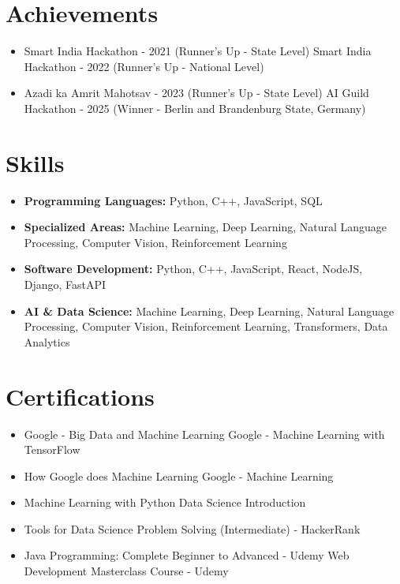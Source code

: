 \documentclass[a4paper,10pt]{article}
\begin{document}
\section*{Achievements}
\begin{itemize}
\item Smart India Hackathon - 2021 (Runner's Up - State Level) \hfill Smart India Hackathon - 2022 (Runner's Up - National Level)
\item Azadi ka Amrit Mahotsav - 2023 (Runner's Up - State Level) \hfill AI Guild Hackathon - 2025 (Winner - Berlin and Brandenburg State, Germany)
\end{itemize}

\section*{Skills}
\begin{itemize}
  \item \textbf{Programming Languages:} Python, C++, JavaScript, SQL
  \item \textbf{Specialized Areas:} Machine Learning, Deep Learning, Natural Language Processing, Computer Vision, Reinforcement Learning
  \item \textbf{Software Development:} Python, C++, JavaScript, React, NodeJS, Django, FastAPI
  \item \textbf{AI \& Data Science:} Machine Learning, Deep Learning, Natural Language Processing, Computer Vision, Reinforcement Learning, Transformers, Data Analytics
\end{itemize}

\section*{Certifications}
\begin{itemize}
\item Google - Big Data and Machine Learning \hfill Google - Machine Learning with TensorFlow
\item How Google does Machine Learning \hfill Google - Machine Learning
\item Machine Learning with Python \hfill Data Science Introduction
\item Tools for Data Science \hfill Problem Solving (Intermediate) - HackerRank
\item Java Programming: Complete Beginner to Advanced - Udemy \hfill Web Development Masterclass Course - Udemy
\end{itemize}
\end{document}
